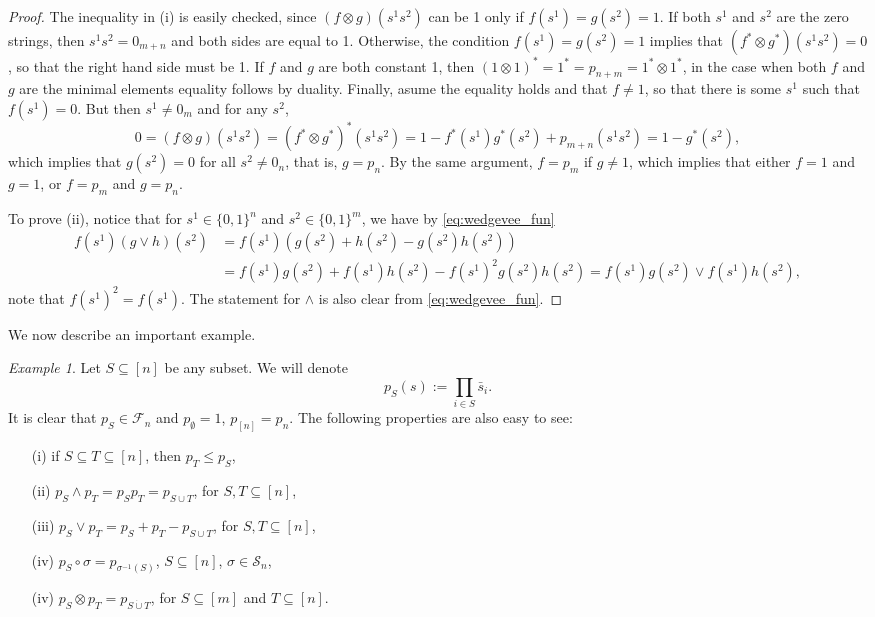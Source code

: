 \documentclass[12pt]{article}
\theoremstyle{definition}
\theoremstyle{remark}
\newtheorem{exm}{Example}
\def\Fe{\mathcal F}
\def\permut{\mathscr{S}}
\begin{document}
\begin{proof} The inequality in (i) is easily  checked, since $(f\otimes g)(s^1s^2)$ can be 1 only if
$f(s^1)=g(s^2)=1$. If both $s^1$ and $s^2$ are the zero strings, then $s^1s^2=0_{m+n}$ and both sides
are equal to 1. Otherwise, the condition $f(s^1)=g(s^2)=1$ implies that $(f^*\otimes
g^*)(s^1s^2)=0$, so that the right hand side must be 1. If $f$ and $g$ are both
constant 1, then $(1\otimes 1)^*=1^*=p_{n+m}=1^*\otimes 1^*$, in the case when both $f$
and $g$ are the minimal elements equality  follows by
duality. Finally, asume the equality holds and that $f\ne 1$, so that there is some $s^1$ such that 
$f(s^1)=0$. But then $s^1\ne 0_m$ and for any $s^2$,
\[
0=(f\otimes g)(s^1s^2)=(f^*\otimes
g^*)^*(s^1s^2)=1-f^*(s^1)g^*(s^2)+p_{m+n}(s^1s^2)=1-g^*(s^2),
\]
which implies that $g(s^2)=0$ for all $s^2\ne0_n$, that is, $g=p_n$. By the same argument,
$f=p_m$ if $g\ne 1$, which implies that either $f=1$ and $g=1$, or $f=p_m$ and $g=p_n$.

To prove (ii), notice that for $s^1\in \{0,1\}^n$ and $s^2\in \{0,1\}^m$,  we have by
\eqref{eq:wedgevee_fun}
\begin{align*}
f(s^1)(g\vee h)(s^2)&=
f(s^1)\left(g(s^2)+h(s^2)-g(s^2)h(s^2)\right)\\&=f(s^1)g(s^2)+f(s^1)h(s^2)-f(s^1)^2g(s^2)h(s^2)=f(s^1)g(s^2)\vee
f(s^1)h(s^2),
\end{align*}
note that $f(s^1)^2=f(s^1)$. The statement for $\wedge$ is also clear from
\eqref{eq:wedgevee_fun}.

\end{proof}



We now describe  an important example. 


\begin{exm}\label{ex:ps} Let $S\subseteq [n]$ be any subset. We will denote
\[
p_S(s):=\prod_{i\in S}\bar s_i.
\]
It is clear that $p_S\in \Fe_n$ and  $p_{\emptyset}=1$, $p_{[n]}=p_n$. The following
properties are also easy
to see:
\begin{enumerate}
\item[(i)] if $S\subseteq T\subseteq [n]$, then $p_T\le p_S$,
\item[(ii)]  $p_S\wedge p_T=p_Sp_T=p_{S\cup T}$, for $S,T\subseteq [n]$,
\item[(iii)]  $p_S\vee p_T=p_S+p_T-p_{S\cup T}$, for $S,T\subseteq [n]$,
\item[(iv)] $p_S\circ\sigma=p_{\sigma^{-1}(S)}$, $S\subseteq [n]$, $\sigma\in \permut_n$,
\item[(iv)] $p_S\otimes p_T=p_{S\dot{\cup} T}$, for  $S\subseteq [m]$ and $T\subseteq
[n]$.

\end{enumerate}


\end{exm}
\end{document}
